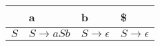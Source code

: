 \documentclass{standalone}
\begin{document}
\begin{tabularx}{\textwidth}{XXXX}
     & a & b & \$ \\
    \midrule
        \(S\)
        &
        \(S \rightarrow aSb\)
        &
        \(S \rightarrow \epsilon\)
        &
        \(S \rightarrow \epsilon\)
\end{tabularx}
\end{document}
